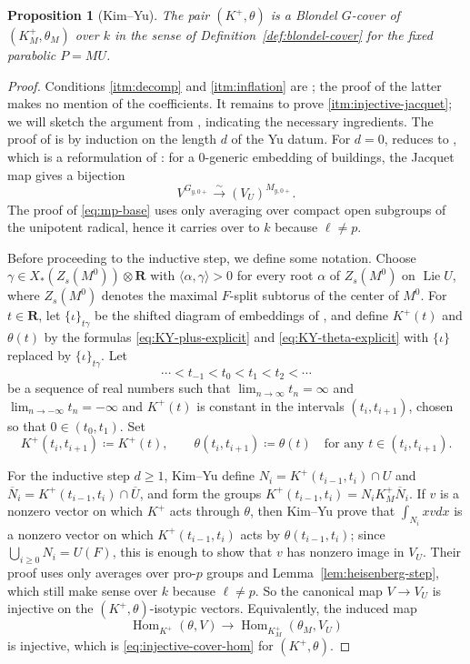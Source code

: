 \documentclass[reqno]{amsart}
\numberwithin{equation}{subsection}
\newcommand{\RR}{\mathbf{R}}
\newcommand{\ol}[1]{\overline{#1}}
\newcommand{\io}{\iota}
\DeclareMathOperator{\Hom}{Hom}
\DeclareMathOperator{\Lie}{Lie}
\newtheorem{prop}[thm]{Proposition}
\theoremstyle{remark}
\numberwithin{equation}{subsection}
\numberwithin{figure}{subsection}
\begin{document}
\begin{prop}[Kim--Yu]\label{prop:KY-cover}
The pair $(K^+,\theta)$ is a Blondel $G$-cover of $(K_M^+,\theta_M)$ over $k$ in the sense of Definition~\ref{def:blondel-cover} for the fixed parabolic $P=MU$.
\end{prop}

\begin{proof}
Conditions \ref{itm:decomp} and \ref{itm:inflation} are \cite[Lemma 6.2]{KY17}; the proof of the latter makes no mention of the coefficients. It remains to prove \ref{itm:injective-jacquet}; we will sketch the argument from \cite{KY17}, indicating the necessary ingredients. The proof of \cite[Theorem 6.3]{KY17} is by induction on the length $d$ of the Yu datum. For $d=0$, \cite[Theorem 6.3]{KY17} reduces to \cite[Proposition 3.3]{KY17}, which is a reformulation of \cite[Proposition 6.7]{MP96}: for a $0$-generic embedding of buildings, the Jacquet map gives a bijection
\begin{equation}\label{eq:mp-base}
V^{G_{y,0+}}\xrightarrow{\sim} (V_U)^{M_{y,0+}} .
\end{equation}
The proof of \eqref{eq:mp-base} uses only averaging over compact open subgroups of the unipotent radical, hence it carries over to $k$ because $\ell \neq p$.

Before proceeding to the inductive step, we define some notation. Choose $\gamma\in X_*(Z_s(M^0))\otimes\RR$ with $\langle\alpha,\gamma\rangle>0$ for every root $\alpha$ of $Z_s(M^0)$ on $\Lie U$, where $Z_s(M^0)$ denotes the maximal $F$-split subtorus of the center of $M^0$. For $t\in\RR$, let $\{\io\}_{t\gamma}$ be the shifted diagram of embeddings of \cite[\S 3.6]{KY17}, and define $K^+(t)$ and $\theta(t)$ by the formulas \eqref{eq:KY-plus-explicit} and \eqref{eq:KY-theta-explicit} with $\{\io\}$ replaced by $\{\io\}_{t\gamma}$.  Let
\[
\cdots<t_{-1}<t_0<t_1<t_2<\cdots
\]
be a sequence of real numbers such that $\lim_{n\to\infty} t_n = \infty$ and $\lim_{n\to-\infty} t_n = -\infty$ and $K^+(t)$ is constant in the intervals $(t_i, t_{i+1})$, chosen so that $0\in(t_0,t_1)$. Set
\[
K^+(t_i,t_{i+1}) \coloneqq K^+(t),
\qquad
\theta(t_i,t_{i+1}) \coloneqq \theta(t)
\quad \text{for any }t\in(t_i,t_{i+1}).
\]

For the inductive step $d\geq 1$, Kim--Yu define $N_i = K^+(t_{i-1},t_i) \cap U$ and $\ol N_i = K^+(t_{i-1},t_i) \cap \ol U$, and form the groups $K^+(t_{i-1},t_i)=N_iK_M^+\ol N_i$. If $v$ is a nonzero vector on which $K^+$ acts through $\theta$, then Kim--Yu prove that $\int_{N_i} xvdx$ is a nonzero vector on which $K^+(t_{i-1},t_i)$ acts by $\theta(t_{i-1},t_i)$; since $\bigcup_{i \geq 0} N_i = U(F)$, this is enough to show that $v$ has nonzero image in $V_U$. Their proof uses only averages over pro-$p$ groups and Lemma~\ref{lem:heisenberg-step}, which still make sense over $k$ because $\ell\neq p$. So the canonical map $V\to V_U$ is injective on the $(K^+,\theta)$-isotypic vectors. Equivalently, the induced map
\[
\Hom_{K^+}(\theta,V)\longrightarrow
\Hom_{K_M^+}(\theta_M,V_U)
\]
is injective, which is \eqref{eq:injective-cover-hom} for $(K^+,\theta)$.
\end{proof}
\end{document}
